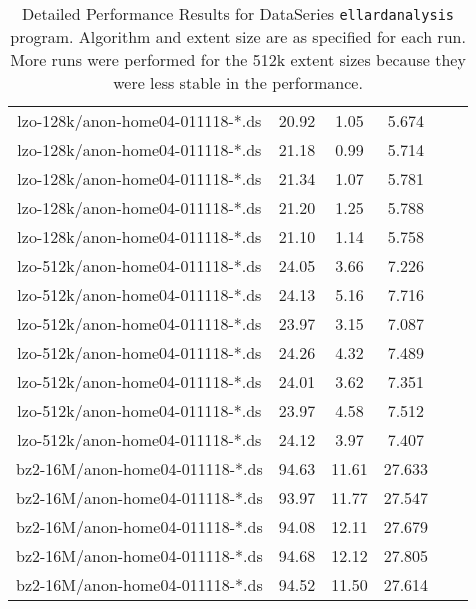 \begin{table*}[tbh]
\begin{tabular}{|c|c|c|c|c|c|}
lzo-128k/anon-home04-011118-*.ds & 20.92 & 1.05 & 5.674 \\
lzo-128k/anon-home04-011118-*.ds & 21.18 & 0.99 & 5.714 \\
lzo-128k/anon-home04-011118-*.ds & 21.34 & 1.07 & 5.781 \\
lzo-128k/anon-home04-011118-*.ds & 21.20 & 1.25 & 5.788 \\
lzo-128k/anon-home04-011118-*.ds & 21.10 & 1.14 & 5.758 \\

lzo-512k/anon-home04-011118-*.ds & 24.05 & 3.66 & 7.226 \\
lzo-512k/anon-home04-011118-*.ds & 24.13 & 5.16 & 7.716 \\
lzo-512k/anon-home04-011118-*.ds & 23.97 & 3.15 & 7.087 \\
lzo-512k/anon-home04-011118-*.ds & 24.26 & 4.32 & 7.489 \\
lzo-512k/anon-home04-011118-*.ds & 24.01 & 3.62 & 7.351 \\
lzo-512k/anon-home04-011118-*.ds & 23.97 & 4.58 & 7.512 \\
lzo-512k/anon-home04-011118-*.ds & 24.12 & 3.97 & 7.407 \\

bz2-16M/anon-home04-011118-*.ds & 94.63 & 11.61 & 27.633 \\
bz2-16M/anon-home04-011118-*.ds & 93.97 & 11.77 & 27.547 \\
bz2-16M/anon-home04-011118-*.ds & 94.08 & 12.11 & 27.679 \\
bz2-16M/anon-home04-011118-*.ds & 94.68 & 12.12 & 27.805 \\
bz2-16M/anon-home04-011118-*.ds & 94.52 & 11.50 & 27.614 \\ 
\hline
\end{tabular}

\caption{Detailed Performance Results for DataSeries
\texttt{ellardanalysis} program.  Algorithm and extent size are as
specified for each run.  More runs were performed for the 512k extent
sizes because they were less stable in the performance.}
\label{tab:dataseries}

\end{table*}


